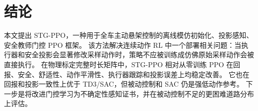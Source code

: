 \documentclass[UTF8,letterpaper,twocolumn]{ctexart}
\begin{document}
\section{结论}

本文提出 STG-PPO，一种用于全车主动悬架控制的离线模仿初始化、投影感知、安全教师门控 PPO 框架。
该方法解决连续动作 RL 中一个部署相关问题：当执行器和安全投影会显著修改采样动作时，策略不应被训练成仿佛原始采样动作会被直接执行。
在物理标定完整时长矩阵中，STG-PPO 相对从零训练 PPO 在回报、安全、舒适性、动作平滑性、执行器跟踪和投影误差上均稳定改善。
它也在回报和投影一致性上优于 TD3/SAC，但被动控制和 SAC 仍是强低动作参考。
下一步是将改进门控学习为不确定性感知证书，并在被动控制不足的更困难道路分布上评估。



\end{document}
